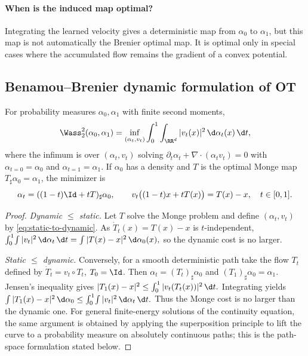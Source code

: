 \paragraph{When is the induced map optimal?}
Integrating the learned velocity gives a deterministic map from $\alpha_0$ to $\alpha_1$, but this map is not automatically the Brenier optimal map. It is optimal only in special cases where the accumulated flow remains the gradient of a convex potential.

\subsection{Benamou--Brenier dynamic formulation of OT}
\begin{thm}
For probability measures $\alpha_0,\alpha_1$ with finite second moments,
\begin{equation}\label{eq:benamou-brenier}
\Wass_2^2(\alpha_0,\alpha_1)
= \inf_{(\alpha_t,v_t)} \int_0^1 \int_{\RR^d} |v_t(x)|^2\, \d\alpha_t(x)\, \d t,
\end{equation}
where the infimum is over $(\alpha_t,v_t)$ solving
$\partial_t\alpha_t+\nabla\!\cdot(\alpha_t v_t)=0$ with $\alpha_{t=0}=\alpha_0$ and $\alpha_{t=1}=\alpha_1$.
If $\alpha_0$ has a density and $T$ is the optimal Monge map $T_{\sharp}\alpha_0=\alpha_1$, the minimizer is
\begin{equation}\label{eq:static-to-dynamic}
\alpha_t=((1-t)\Id+tT)_{\sharp}\alpha_0,
\qquad
v_t\bigl((1-t)x+tT(x)\bigr)=T(x)-x,\quad t\in[0,1].
\end{equation}
\end{thm}
\begin{proof}
\textit{Dynamic $\le$ static.} Let $T$ solve the Monge problem and define $(\alpha_t,v_t)$ by \eqref{eq:static-to-dynamic}. As $\dot T_t(x)=T(x)-x$ is $t$-independent,
\(\int_0^1\!\int |v_t|^2\,\d\alpha_t\,\d t=\int |T(x)-x|^2\,\d\alpha_0(x),\)
so the dynamic cost is no larger.

\smallskip
\textit{Static $\le$ dynamic.} Conversely, for a smooth deterministic path take the flow $T_t$ defined by $\dot T_t=v_t\!\circ\!T_t$, $T_0=\Id$. Then $\alpha_t=(T_t)_{\sharp}\alpha_0$ and $(T_1)_{\sharp}\alpha_0=\alpha_1$. Jensen's inequality gives
\(|T_1(x)-x|^2\le\int_0^1|v_t(T_t(x))|^2\,\d t.\)
Integrating yields
\(\int|T_1(x)-x|^2\,\d\alpha_0\le\int_0^1\!\int|v_t|^2\,\d\alpha_t\,\d t.\)
Thus the Monge cost is no larger than the dynamic one. For general finite-energy solutions of the continuity equation, the same argument is obtained by applying the superposition principle to lift the curve to a probability measure on absolutely continuous paths; this is the path-space formulation stated below.
\end{proof}
